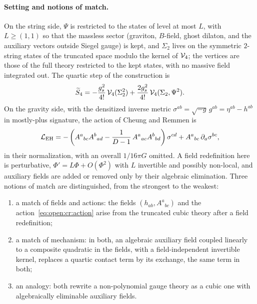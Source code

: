 \paragraph{Setting and notions of match.}
On the string side, $\Psi$ is restricted to the states of level at most $L$, with $L \ge (1, 1)$ so that the massless sector (graviton, $B$-field, ghost dilaton, and the auxiliary vectors outside Siegel gauge) is kept, and $\Sigma_2$ lives on the symmetric $2$-string states of the truncated space modulo the kernel of $\mathcal{V}_{4}$; the vertices are those of the full theory restricted to the kept states, with no massive field integrated out.
The quartic step of the construction is
\begin{equation}
  \label{eq:open:cr:hs4}
  \widetilde S_4
    = - \frac{g_s^2}{4!} \, \mathcal{V}_{4}(\Sigma_2^2)
    + \frac{2 g_s^2}{4!} \, \mathcal{V}_{4}(\Sigma_2, \Psi^2).
\end{equation}
On the gravity side, with the densitized inverse metric $\sigma^{ab} = \sqrt{- g} \, g^{ab} = \eta^{ab} - h^{ab}$ in mostly-plus signature, the action of Cheung and Remmen is
\begin{equation}
  \label{eq:open:cr:action}
  {\mathcal{L}}_{\rm EH}
    = - \left(
      A^a{}_{bc} A^b{}_{ad}
      - \frac{1}{D - 1} \, A^a{}_{ac} A^b{}_{bd}
    \right) \sigma^{cd}
    + A^a{}_{bc} \, \partial_a \sigma^{bc},
\end{equation}
in their normalization, with an overall $1 / 16 \pi G$ omitted.
A field redefinition here is perturbative, $\Phi' = L \Phi + O(\Phi^2)$ with $L$ invertible and possibly non-local, and auxiliary fields are added or removed only by their algebraic elimination.
Three notions of match are distinguished, from the strongest to the weakest:
\begin{enumerate}
  \setlength{\itemsep}{0.5ex}

  \item a match of fields and actions: the fields $(h_{ab}, A^a{}_{bc})$ and the action~\eqref{eq:open:cr:action} arise from the truncated cubic theory after a field redefinition;
  \item a match of mechanism: in both, an algebraic auxiliary field coupled linearly to a composite quadratic in the fields, with a field-independent invertible kernel, replaces a quartic contact term by its exchange, the same term in both;
  \item an analogy: both rewrite a non-polynomial gauge theory as a cubic one with algebraically eliminable auxiliary fields.
\end{enumerate}

